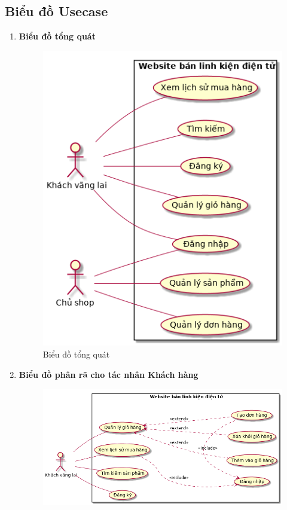 \subsection{Biểu đồ Usecase}
\begin{enumerate}[label=\textbf{\alph*)}]
	\item \textbf{Biểu đồ tổng quát}
	      \begin{figure}[h!]
		      \centering
		      \includegraphics[scale=0.7]{fig/uc_all.png}
		      \caption{Biểu đồ tổng quát}
	      \end{figure}
	      \newpage
	\item \textbf{Biểu đồ phân rã cho tác nhân Khách hàng}
	      \begin{figure}[h!]
		      \centering
		      \includegraphics[scale=0.58]{fig/uc_user.png}

\end{figure}
\end{enumerate}
